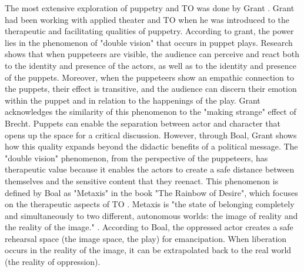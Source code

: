 \documentclass[dissertation,math,vertlayout,pdfa,colorlinks,nologo]{aaltoseries}
\begin{document}
The most extensive exploration of puppetry and TO was done by Grant \cite{grantObjectsObjectivesApplied2020}. Grant had been working with applied theater and TO when he was introduced to the therapeutic and facilitating qualities of puppetry. According to grant, the power lies in the phenomenon of "double vision" \cite{mortonHyperobjectsPhilosophyEcology2013} that occurs in puppet plays. Research shows that when puppeteers are visible, the audience can perceive and react both to the identity and presence of the actors, as well as to the identity and presence of the puppets. Moreover, when the puppeteers show an empathic connection to the puppets, their effect is transitive, and the audience can discern their emotion within the puppet and in relation to the happenings of the play. Grant acknowledges the similarity of this phenomenon to the "making strange" effect of Brecht. Puppets can enable the separation between actor and character that opens up the space for a critical discussion. However, through Boal, Grant shows how this quality expands beyond the didactic benefits of a political message. The "double vision" phenomenon, from the perspective of the puppeteers, has therapeutic value because it enables the actors to create a safe distance between themselves and the sensitive content that they reenact. This phenomenon is defined by Boal as "Metaxis" in the book "The Rainbow of Desire",  which focuses on the therapeutic aspects of TO \cite{boalRainbowDesireBoal2013}. Metaxis is "the state of belonging completely and simultaneously to two different, autonomous worlds: the image of reality and the reality of the image." \cite[p. 43]{boalRainbowDesireBoal2013}. According to Boal, the oppressed actor creates a safe rehearsal space (the image space, the play) for emancipation. When liberation occurs in the reality of the image, it can be extrapolated back to the real world (the reality of oppression).
\end{document}
